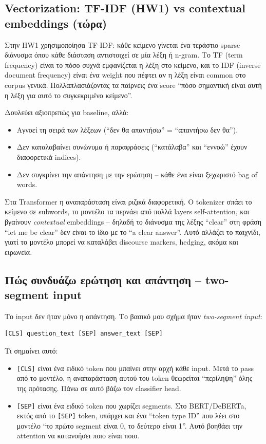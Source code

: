 \documentclass[12pt]{fphw}
\begin{document}
\subsection{Vectorization: TF-IDF (HW1) vs contextual embeddings (τώρα)}

Στην HW1 χρησιμοποίησα TF-IDF: κάθε κείμενο γίνεται ένα τεράστιο sparse διάνυσμα όπου κάθε διάσταση αντιστοιχεί σε μία λέξη ή n-gram. Το TF (term frequency) είναι το πόσο συχνά εμφανίζεται η λέξη στο κείμενο, και το IDF (inverse document frequency) είναι ένα weight που πέφτει αν η λέξη είναι common στο corpus γενικά. Πολλαπλασιάζοντάς τα παίρνεις ένα score ``πόσο σημαντική είναι αυτή η λέξη για αυτό το συγκεκριμένο κείμενο''.

Δουλεύει αξιοπρεπώς για baseline, αλλά:

\begin{itemize}
    \item Αγνοεί τη σειρά των λέξεων (``δεν θα απαντήσω'' = ``απαντήσω δεν θα'').
    \item Δεν καταλαβαίνει συνώνυμα ή παραφράσεις (``κατάλαβα'' και ``εννοώ'' έχουν διαφορετικά indices).
    \item Δεν συγκρίνει την απάντηση με την ερώτηση -- κάθε ένα είναι ξεχωριστό bag of words.
\end{itemize}

Στα Transformer η αναπαράσταση είναι ριζικά διαφορετική. Ο tokenizer σπάει το κείμενο σε subwords, το μοντέλο τα περνάει από πολλά layers self-attention, και βγαίνουν \emph{contextual} embeddings -- δηλαδή το διάνυσμα της λέξης ``clear'' στη φράση ``let me be clear'' δεν είναι το ίδιο με το ``a clear answer''. Αυτό αλλάζει το παιχνίδι, γιατί το μοντέλο μπορεί να καταλάβει discourse markers, hedging, ακόμα και ειρωνεία.

\subsection{Πώς συνδυάζω ερώτηση και απάντηση -- two-segment input}

Το input δεν ήταν μόνο η απάντηση. Το βασικό μου σχήμα ήταν \emph{two-segment input}:

\begin{verbatim}
[CLS] question_text [SEP] answer_text [SEP]
\end{verbatim}

Τι σημαίνει αυτό:

\begin{itemize}
    \item \texttt{[CLS]} είναι ένα ειδικό token που μπαίνει στην αρχή κάθε input. Μετά το pass από το μοντέλο, η αναπαράσταση αυτού του token θεωρείται ``περίληψη'' όλης της πρότασης. Πάνω σε αυτό βάζω τον classifier head.
    \item \texttt{[SEP]} είναι ένα ειδικό token που χωρίζει segments. Στο BERT/DeBERTa, εκτός από το \texttt{[SEP]} token, υπάρχει και ένα ``token type ID'' που λέει στο μοντέλο ``το πρώτο segment είναι 0, το δεύτερο είναι 1''. Αυτό βοηθάει την attention να κατανοήσει ποιο είναι ποιο.
\end{itemize}
\end{document}
